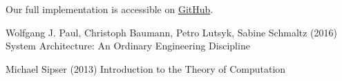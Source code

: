 \documentclass[11pt]{report}
\begin{document}
    Our full implementation is accessible on \href{https://github.com/fyfsb/dcfg.git}{GitHub}.


    \tableofcontents
    
    

    \begin{thebibliography}{9}
        Wolfgang J. Paul, Christoph Baumann, Petro Lutsyk, Sabine Schmaltz (2016) System Architecture: An Ordinary Engineering Discipline

        Michael Sipser (2013) Introduction to the Theory of Computation
    \end{thebibliography}
\end{document}
